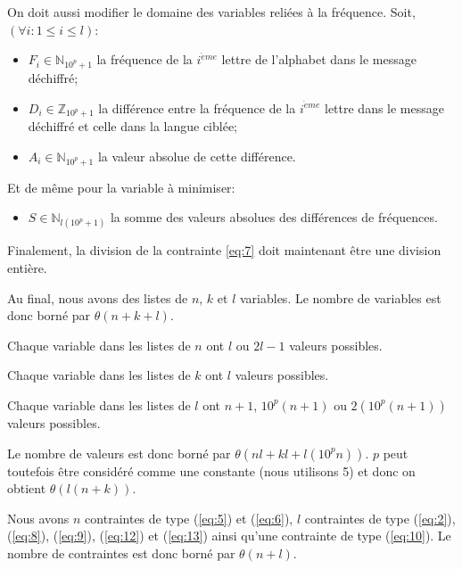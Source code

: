 \documentclass[11pt]{article}
\begin{document}
				\bigskip

				On doit aussi modifier le domaine des variables reliées à la fréquence. Soit, $(\forall i : 1 \leq i \leq l)$:
				\begin{itemize}
					\item $F_i \in \mathbb{N}_{10^p + 1}$ la fréquence de la $i^{\grave{e}me}$ lettre de l'alphabet dans le message déchiffré;
					\item $D_i \in \mathbb{Z}_{10^p + 1}$ la différence entre la fréquence de la $i^{\grave{e}me}$ lettre dans le message déchiffré et celle dans la langue ciblée;
					\item $A_i \in \mathbb{N}_{10^p + 1}$ la valeur absolue de cette différence.
				\end{itemize}

				\bigskip

				Et de même pour la variable à minimiser:
				\begin{itemize}
					\item $S \in \mathbb{N}_{l(10^p + 1)}$ la somme des valeurs absolues des différences de fréquences.
				\end{itemize}

				\bigskip

				Finalement, la division de la contrainte \ref{eq:7} doit maintenant être une division entière.

				\bigskip

				Au final, nous avons des listes de $n$, $k$ et $l$ variables. Le nombre de variables est donc borné par $\theta(n + k + l)$.

				\bigskip

				Chaque variable dans les listes de $n$ ont $l$ ou $2l - 1$ valeurs possibles.

				Chaque variable dans les listes de $k$ ont $l$ valeurs possibles.

				Chaque variable dans les listes de $l$ ont $n+1$, $10^p(n+1)$ ou $2(10^p(n+1))$ valeurs possibles.

				Le nombre de valeurs est donc borné par $\theta(nl + kl + l(10^pn))$. $p$ peut toutefois être considéré comme une constante (nous utilisons 5) et donc on obtient $\theta(l(n + k))$.

				\bigskip

				Nous avons $n$ contraintes de type (\ref{eq:5}) et (\ref{eq:6}), $l$ contraintes de type (\ref{eq:2}), (\ref{eq:8}), (\ref{eq:9}), (\ref{eq:12}) et (\ref{eq:13}) ainsi qu'une contrainte de type (\ref{eq:10}). Le nombre de contraintes est donc borné par $\theta(n + l)$.
\end{document}
